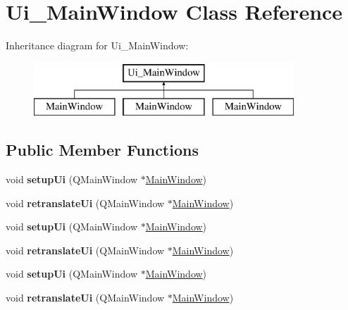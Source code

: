 \hypertarget{class_ui___main_window}{}\section{Ui\+\_\+\+Main\+Window Class Reference}
\label{class_ui___main_window}
Inheritance diagram for Ui\+\_\+\+Main\+Window\+:\begin{figure}[H]
\begin{center}
\leavevmode
\includegraphics[height=2.000000cm]{class_ui___main_window}
\end{center}
\end{figure}
\subsection*{Public Member Functions}
\begin{DoxyCompactItemize}
\item 
\mbox{\label{class_ui___main_window_a15177a8a34a9348034206a261954fa1d}} 
void {\bfseries setup\+Ui} (Q\+Main\+Window $\ast$\mbox{\hyperlink{class_main_window}{Main\+Window}})
\item 
\mbox{\label{class_ui___main_window_adabcb0f9a7fadfc71cfdff16928339c5}} 
void {\bfseries retranslate\+Ui} (Q\+Main\+Window $\ast$\mbox{\hyperlink{class_main_window}{Main\+Window}})
\item 
\mbox{\label{class_ui___main_window_a15177a8a34a9348034206a261954fa1d}} 
void {\bfseries setup\+Ui} (Q\+Main\+Window $\ast$\mbox{\hyperlink{class_main_window}{Main\+Window}})
\item 
\mbox{\label{class_ui___main_window_adabcb0f9a7fadfc71cfdff16928339c5}} 
void {\bfseries retranslate\+Ui} (Q\+Main\+Window $\ast$\mbox{\hyperlink{class_main_window}{Main\+Window}})
\item 
\mbox{\label{class_ui___main_window_a15177a8a34a9348034206a261954fa1d}} 
void {\bfseries setup\+Ui} (Q\+Main\+Window $\ast$\mbox{\hyperlink{class_main_window}{Main\+Window}})
\item 
\mbox{\label{class_ui___main_window_adabcb0f9a7fadfc71cfdff16928339c5}} 
void {\bfseries retranslate\+Ui} (Q\+Main\+Window $\ast$\mbox{\hyperlink{class_main_window}{Main\+Window}})
\end{DoxyCompactItemize}
